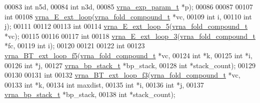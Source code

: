 \begin{DoxyCode}
00083                     \textcolor{keywordtype}{int}               n5d,
00084                     \textcolor{keywordtype}{int}               n3d,
00085                     \mbox{\hyperlink{group__energy__parameters_structvrna__exp__param__s}{vrna\_exp\_param\_t}}  *p);
00086 
00087 
00107 \textcolor{keywordtype}{int}
00108 \mbox{\hyperlink{group__loops_gafe7e94269aaae793a09427364ebb1ec0}{vrna\_E\_ext\_loop}}(\mbox{\hyperlink{group__fold__compound_structvrna__fc__s}{vrna\_fold\_compound\_t}}  *vc,
00109                 \textcolor{keywordtype}{int}                   i,
00110                 \textcolor{keywordtype}{int}                   j);
00111 
00112 
00113 \textcolor{keywordtype}{int}
00114 \mbox{\hyperlink{group__loops_ga5dfb0f165d3a69a1a1ba82ace3002f0d}{vrna\_E\_ext\_loop\_5}}(\mbox{\hyperlink{group__fold__compound_structvrna__fc__s}{vrna\_fold\_compound\_t}} *vc);
00115 
00116 
00117 \textcolor{keywordtype}{int}
00118 \mbox{\hyperlink{group__loops_ga6e57363a8ff3597cc69181c33fbb8196}{vrna\_E\_ext\_loop\_3}}(\mbox{\hyperlink{group__fold__compound_structvrna__fc__s}{vrna\_fold\_compound\_t}}  *fc,
00119                   \textcolor{keywordtype}{int}                   i);
00120 
00121 
00122 \textcolor{keywordtype}{int}
00123 \mbox{\hyperlink{group__loops_ga55074e49f49ac4cd71395b1bb7a35f5b}{vrna\_BT\_ext\_loop\_f5}}(\mbox{\hyperlink{group__fold__compound_structvrna__fc__s}{vrna\_fold\_compound\_t}}  *vc,
00124                     \textcolor{keywordtype}{int}                   *k,
00125                     \textcolor{keywordtype}{int}                   *i,
00126                     \textcolor{keywordtype}{int}                   *j,
00127                     \mbox{\hyperlink{group__data__structures_structvrna__bp__stack__s}{vrna\_bp\_stack\_t}}       *bp\_stack,
00128                     \textcolor{keywordtype}{int}                   *stack\_count);
00129 
00130 
00131 \textcolor{keywordtype}{int}
00132 \mbox{\hyperlink{group__loops_gaf80500114aa4eed8f9dba1e98a1056a7}{vrna\_BT\_ext\_loop\_f3}}(\mbox{\hyperlink{group__fold__compound_structvrna__fc__s}{vrna\_fold\_compound\_t}}  *vc,
00133                     \textcolor{keywordtype}{int}                   *k,
00134                     \textcolor{keywordtype}{int}                   maxdist,
00135                     \textcolor{keywordtype}{int}                   *i,
00136                     \textcolor{keywordtype}{int}                   *j,
00137                     \mbox{\hyperlink{group__data__structures_structvrna__bp__stack__s}{vrna\_bp\_stack\_t}}       *bp\_stack,
00138                     \textcolor{keywordtype}{int}                   *stack\_count);

\end{DoxyCode}
